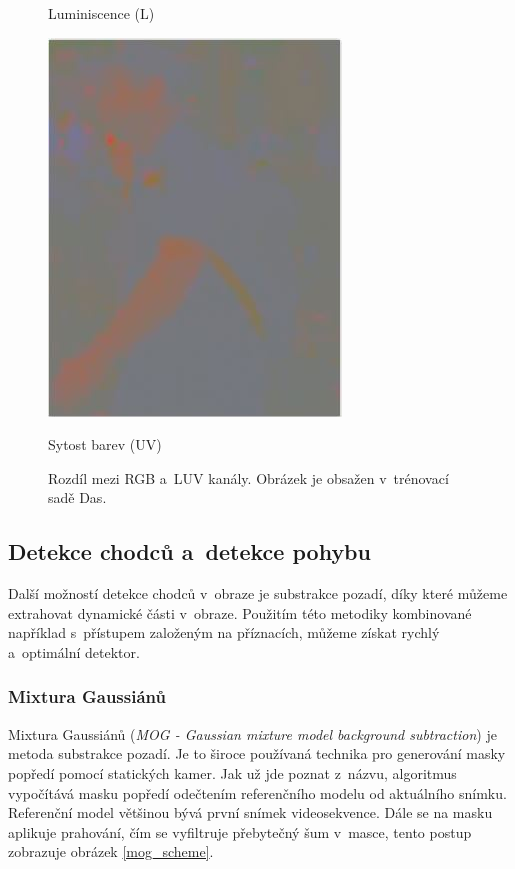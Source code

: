 \begin{figure}[H]
\begin{minipage}[b]{.3\textwidth}
  \caption*{Luminiscence  (L)}
\end{minipage}
\begin{minipage}[b]{.3\textwidth}
  \centering
  \includegraphics[width=.8\linewidth]{figures/uv_chroma}
  \caption*{Sytost barev (UV)}
\end{minipage}
\caption{Rozdíl mezi RGB a~LUV kanály. Obrázek je obsažen v~trénovací sadě Das\cite{sudipdas}.}
\label{fig:luv}
\end{figure}

\subsection{Detekce chodců a~detekce pohybu} %
Další možností detekce chodců v~obraze je substrakce pozadí, díky které můžeme extrahovat dynamické části v~obraze. Použitím této metodiky kombinované například s~přístupem založeným na příznacích, můžeme získat rychlý a~optimální detektor.

\subsubsection*{Mixtura Gaussiánů}
Mixtura Gaussiánů (\textit{MOG - Gaussian mixture model background subtraction}) \cite{mog:zivkovic} je metoda substrakce pozadí. Je to široce používaná technika pro generování masky popředí pomocí statických kamer. Jak už jde poznat z~názvu, algoritmus vypočítává masku popředí odečtením referenčního modelu od aktuálního snímku. Referenční model většinou bývá první snímek videosekvence. Dále se na masku aplikuje prahování, čím se vyfiltruje přebytečný šum v~masce, tento postup zobrazuje obrázek \ref{mog_scheme}.

